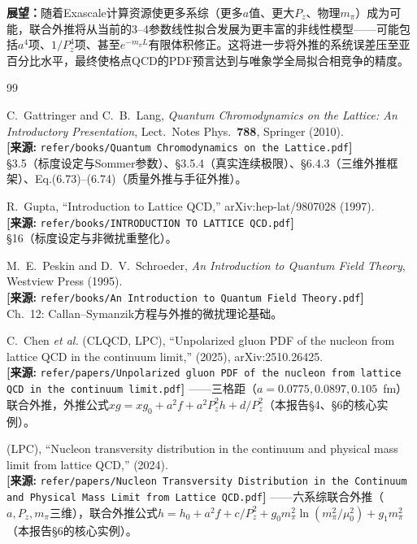 \documentclass[12pt,a4paper]{ctexart}
\theoremstyle{definition}
\begin{document}
\textbf{展望：}随着Exascale计算资源使更多系综（更多$a$值、更大$P_z$、物理$m_\pi$）成为可能，联合外推将从当前的3--4参数线性拟合发展为更丰富的非线性模型——可能包括$a^4$项、$1/P_z^4$项、甚至$e^{-m_\pi L}$有限体积修正。这将进一步将外推的系统误差压至亚百分比水平，最终使格点QCD的PDF预言达到与唯象学全局拟合相竞争的精度。

\begin{thebibliography}{99}

C.~Gattringer and C.~B.~Lang,
\textit{Quantum Chromodynamics on the Lattice: An Introductory Presentation},
Lect.\ Notes Phys.\ \textbf{788}, Springer (2010).
\\\textbf{[来源:} \texttt{refer/books/Quantum Chromodynamics on the Lattice.pdf}\textbf{]}
\\§3.5（标度设定与Sommer参数）、§3.5.4（真实连续极限）、§6.4.3（三维外推框架）、Eq.(6.73)--(6.74)（质量外推与手征外推）。

R.~Gupta,
``Introduction to Lattice QCD,''
arXiv:hep-lat/9807028 (1997).
\\\textbf{[来源:} \texttt{refer/books/INTRODUCTION TO LATTICE QCD.pdf}\textbf{]}
\\§16（标度设定与非微扰重整化）。

M.~E.~Peskin and D.~V.~Schroeder,
\textit{An Introduction to Quantum Field Theory},
Westview Press (1995).
\\\textbf{[来源:} \texttt{refer/books/An Introduction to Quantum Field Theory.pdf}\textbf{]}
\\Ch.~12: Callan--Symanzik方程与外推的微扰理论基础。

C.~Chen \textit{et al.} (CLQCD, LPC),
``Unpolarized gluon PDF of the nucleon from lattice QCD in the continuum limit,''
(2025), arXiv:2510.26425.
\\\textbf{[来源:} \texttt{refer/papers/Unpolarized gluon PDF of the nucleon from lattice QCD in the continuum limit.pdf}\textbf{]}
——三格距（$a = 0.0775, 0.0897, 0.105$~fm）联合外推，外推公式$xg = xg_0 + a^2 f + a^2 P_z^2 h + d/P_z^2$（本报告§4、§6的核心实例）。

(LPC),
``Nucleon transversity distribution in the continuum and physical mass limit from lattice QCD,''
(2024).
\\\textbf{[来源:} \texttt{refer/papers/Nucleon Transversity Distribution in the Continuum and Physical Mass Limit from Lattice QCD.pdf}\textbf{]}
——六系综联合外推（$a, P_z, m_\pi$三维），联合外推公式$h = h_0 + a^2 f + c/P_z^2 + g_0 m_\pi^2\ln(m_\pi^2/\mu_0^2) + g_1 m_\pi^2$（本报告§6的核心实例）。


\end{thebibliography}
\end{document}
